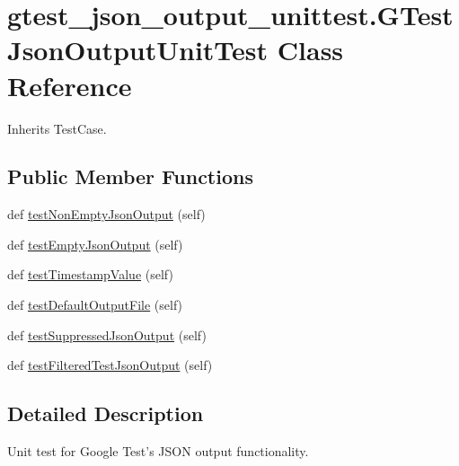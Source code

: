 \hypertarget{classgtest__json__output__unittest_1_1GTestJsonOutputUnitTest}{}\section{gtest\+\_\+json\+\_\+output\+\_\+unittest.\+G\+Test\+Json\+Output\+Unit\+Test Class Reference}
\label{classgtest__json__output__unittest_1_1GTestJsonOutputUnitTest}


Inherits Test\+Case.

\subsection*{Public Member Functions}
\begin{DoxyCompactItemize}
\item 
def \mbox{\hyperlink{classgtest__json__output__unittest_1_1GTestJsonOutputUnitTest_abef79fba2498af16f4f446c8d10d3323}{test\+Non\+Empty\+Json\+Output}} (self)
\item 
def \mbox{\hyperlink{classgtest__json__output__unittest_1_1GTestJsonOutputUnitTest_a2309716603874208a0bc27c769a2f248}{test\+Empty\+Json\+Output}} (self)
\item 
def \mbox{\hyperlink{classgtest__json__output__unittest_1_1GTestJsonOutputUnitTest_ad5e40d519d690564d02576282ca33190}{test\+Timestamp\+Value}} (self)
\item 
def \mbox{\hyperlink{classgtest__json__output__unittest_1_1GTestJsonOutputUnitTest_a76880c5737f5c5a14c0c0e66e10b78de}{test\+Default\+Output\+File}} (self)
\item 
def \mbox{\hyperlink{classgtest__json__output__unittest_1_1GTestJsonOutputUnitTest_aa42c7e4e229c571182d79779a2f9e051}{test\+Suppressed\+Json\+Output}} (self)
\item 
def \mbox{\hyperlink{classgtest__json__output__unittest_1_1GTestJsonOutputUnitTest_ab936dbd247206e395d1754847f8ac80a}{test\+Filtered\+Test\+Json\+Output}} (self)
\end{DoxyCompactItemize}


\subsection{Detailed Description}
\begin{DoxyVerb}Unit test for Google Test's JSON output functionality.
\end{DoxyVerb}
 

